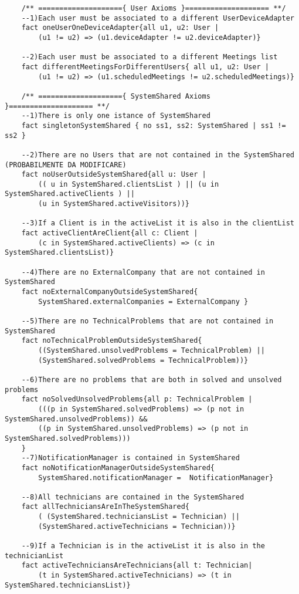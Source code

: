 \documentclass[a4paper,leqno]{book}
\begin{document}
\begin{lstlisting}
	/** ===================={ User Axioms }==================== **/
	--1)Each user must be associated to a different UserDeviceAdapter
	fact oneUserOneDeviceAdapter{all u1, u2: User |
		(u1 != u2) => (u1.deviceAdapter != u2.deviceAdapter)}
	
	--2)Each user must be associated to a different Meetings list
	fact differentMeetingsForDifferentUsers{ all u1, u2: User |
		(u1 != u2) => (u1.scheduledMeetings != u2.scheduledMeetings)}
	
	/** ===================={ SystemShared Axioms }==================== **/
	--1)There is only one istance of SystemShared
	fact singletonSystemShared { no ss1, ss2: SystemShared | ss1 != ss2 }
	
	--2)There are no Users that are not contained in the SystemShared (PROBABILMENTE DA MODIFICARE)
	fact noUserOutsideSystemShared{all u: User |
		(( u in SystemShared.clientsList ) || (u in SystemShared.activeClients ) ||
		(u in SystemShared.activeVisitors))}
	
	--3)If a Client is in the activeList it is also in the clientList
	fact activeClientAreClient{all c: Client |
		(c in SystemShared.activeClients) => (c in SystemShared.clientsList)}
	
	--4)There are no ExternalCompany that are not contained in SystemShared
	fact noExternalCompanyOutsideSystemShared{
		SystemShared.externalCompanies = ExternalCompany }
	
	--5)There are no TechnicalProblems that are not contained in SystemShared
	fact noTechnicalProblemOutsideSystemShared{
		((SystemShared.unsolvedProblems = TechnicalProblem) ||
		(SystemShared.solvedProblems = TechnicalProblem))}
	
	--6)There are no problems that are both in solved and unsolved problems
	fact noSolvedUnsolvedProblems{all p: TechnicalProblem |
		(((p in SystemShared.solvedProblems) => (p not in SystemShared.unsolvedProblems)) &&
		((p in SystemShared.unsolvedProblems) => (p not in SystemShared.solvedProblems)))
	}
	--7)NotificationManager is contained in SystemShared
	fact noNotificationManagerOutsideSystemShared{
		SystemShared.notificationManager =  NotificationManager}
	
	--8)All technicians are contained in the SystemShared
	fact allTechniciansAreInTheSystemShared{
		( (SystemShared.techniciansList = Technician) ||
		(SystemShared.activeTechnicians = Technician))}
	
	--9)If a Technician is in the activeList it is also in the technicianList
	fact activeTechniciansAreTechnicians{all t: Technician|
		(t in SystemShared.activeTechnicians) => (t in SystemShared.techniciansList)}
	

\end{lstlisting}
\end{document}
